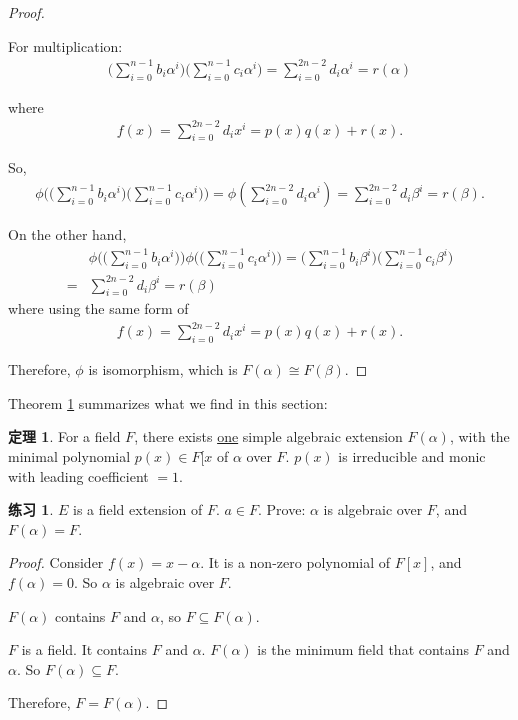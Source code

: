 \documentclass[utf8]{ctexbook}
\theoremstyle{definition}
\newtheorem{prototheorem}{定理}[section]
\newenvironment{theorem}
   {\colorlet{shadecolor}{red!30}\begin{shaded}\begin{prototheorem}}
   {\end{prototheorem}\end{shaded}}
\newtheorem{exercise}{练习}[section]
\begin{document}
\begin{proof}
\begin{itemize}
{For multiplication:
\begin{align*}
\Big(\sum_{i=0}^{n-1} b_i \alpha^i \Big) \Big( \sum_{i=0}^{n-1} c_i \alpha^i \Big) = \sum_{i=0} ^{2n-2} d_i \alpha^i = r(\alpha)
\end{align*}

where
\begin{align*}
f(x) = \sum_{i=0} ^{2n-2} d_i x^i = p(x) q(x) +  r(x) .
\end{align*}

So,
\begin{align*}
\phi\bigg( \Big(\sum_{i=0}^{n-1} b_i \alpha^i \Big) \Big( \sum_{i=0}^{n-1} c_i \alpha^i \Big) \bigg) = \phi(\sum_{i=0} ^{2n-2} d_i \alpha^i) = \sum_{i=0} ^{2n-2} d_i \beta^i = r(\beta) .
\end{align*}

On the other hand,
\begin{align*}
& \phi\bigg( \Big(\sum_{i=0}^{n-1} b_i \alpha^i \Big) \bigg) \phi \bigg( \Big( \sum_{i=0}^{n-1} c_i \alpha^i \Big) \bigg) = \Big(\sum_{i=0}^{n-1} b_i \beta^i \Big) \Big( \sum_{i=0}^{n-1} c_i \beta^i \Big) \\
= & \sum_{i=0} ^{2n-2} d_i \beta^i = r(\beta)
\end{align*}
where using the same form of
\begin{align*}
f(x) = \sum_{i=0} ^{2n-2} d_i x^i = p(x) q(x) +  r(x) .
\end{align*}
}
\end{itemize}

Therefore, $\phi$ is isomorphism, which is $F(\alpha) \cong F(\beta)$.

\end{proof}


Theorem \ref{theorem_4_2_unique_iso_simple_alge_extension} summarizes what we find in this section:

\begin{theorem}
\label{theorem_4_2_unique_iso_simple_alge_extension}
For a field $F$, there exists \underline{one} simple algebraic extension $F(\alpha)$, with the minimal polynomial $p(x)\in F[x$ of $\alpha$ over $F$. $p(x)$ is irreducible and monic with leading coefficient $=1$.  
\end{theorem}

\begin{exercise}
$E$ is a field extension of $F$. $a \in F$. Prove: $\alpha$ is algebraic over $F$, and $F(\alpha) = F$.
\end{exercise}

\begin{proof}
Consider $f(x) = x - \alpha$. It is a non-zero polynomial of $F[x]$, and $f(\alpha) = 0$. So $\alpha$ is algebraic over $F$.

$F(\alpha)$ contains $F$ and $\alpha$, so $F \subseteq F(\alpha)$.

$F$ is a field. It contains $F$ and $\alpha$. $F(\alpha)$ is the minimum field that contains $F$ and $\alpha$. So $F(\alpha) \subseteq F$.

Therefore, $F = F(\alpha)$.
\end{proof}
\end{document}
